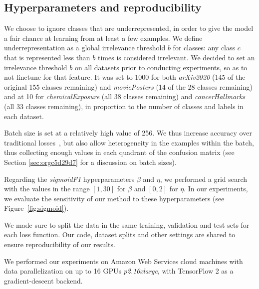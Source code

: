 \subsection{Hyperparameters and reproducibility}
\label{subsec:hypers}

We choose to ignore classes that are underrepresented, in order to give the model a fair chance at learning from at least a few examples. We define underrepresentation as a global irrelevance threshold $b$ for classes: any class $c$ that is represented less than $b$ times is considered irrelevant. We decided to set an irrelevance threshold $b$ on all datasets prior to conducting experiments, so as to not finetune for that feature. It was set to 1000 for both \emph{arXiv2020} (145 of the original 155 classes remaining) and \emph{moviePosters} (14 of the 28 classes remaining) and at 10 for \emph{chemicalExposure} (all 38 classes remaining) and \emph{cancerHallmarks} (all 33 classes remaining), in proportion to the number of classes and labels in each dataset.

Batch size is set at a relatively high value of 256. We thus increase accuracy over traditional losses~\cite{bigBSArxiv}, but also allow heterogeneity in the examples within the batch, thus collecting enough values in each quadrant of the confusion matrix (see Section \ref{sec:orgc5d29d7} for a discussion on batch sizes).

Regarding the \emph{sigmoidF1} hyperparameters $\beta$ and $\eta$, we performed a grid search with the values in the range $[1,30]$ for $\beta$ and $[0, 2]$ for $\eta$.
In our experiments, we evaluate the sensitivity of our method to these hyperparameters (see Figure~\ref{fig:sigmoid}).

We made sure to split the data in the same training, validation and test sets for each loss function. Our code, dataset splits and other settings are shared to ensure reproducibility of our results.

We performed our experiments on Amazon Web Services cloud machines with data parallelization on up to 16 GPUs \textit{p2.16xlarge}, with TensorFlow 2 as a gradient-descent backend.